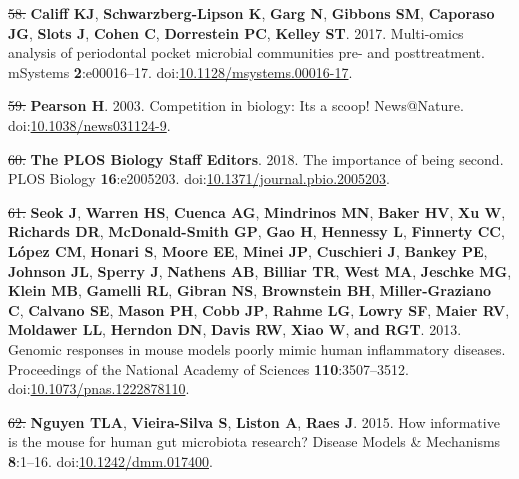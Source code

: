 \documentclass[]{article}
\providecommand{\DIFaddtex}[1]{{\protect\color{blue}\uwave{#1}}} %
\providecommand{\DIFdeltex}[1]{{\protect\color{red}\sout{#1}}}                      %
\providecommand{\DIFaddbegin}{} %
\providecommand{\DIFaddend}{} %
\providecommand{\DIFdelbegin}{} %
\providecommand{\DIFdelend}{} %
\providecommand{\DIFadd}[1]{\texorpdfstring{\DIFaddtex{#1}}{#1}} %
\providecommand{\DIFdel}[1]{\texorpdfstring{\DIFdeltex{#1}}{}} %
\begin{document}
\hypertarget{ref-Califf2017}{}
\DIFdelbegin \DIFdel{58. }\DIFdelend \DIFaddbegin \DIFadd{60. }\DIFaddend \textbf{Califf KJ}, \textbf{Schwarzberg-Lipson K}, \textbf{Garg N},
\textbf{Gibbons SM}, \textbf{Caporaso JG}, \textbf{Slots J},
\textbf{Cohen C}, \textbf{Dorrestein PC}, \textbf{Kelley ST}. 2017.
Multi-omics analysis of periodontal pocket microbial communities pre-
and posttreatment. mSystems \textbf{2}:e00016--17.
doi:\href{https://doi.org/10.1128/msystems.00016-17}{10.1128/msystems.00016-17}.

\hypertarget{ref-Pearson2003}{}
\DIFdelbegin \DIFdel{59. }\DIFdelend \DIFaddbegin \DIFadd{61. }\DIFaddend \textbf{Pearson H}. 2003. Competition in biology: Its a scoop!
News@Nature.
doi:\href{https://doi.org/10.1038/news031124-9}{10.1038/news031124-9}.

\hypertarget{ref-PB2018}{}
\DIFdelbegin \DIFdel{60. }\DIFdelend \DIFaddbegin \DIFadd{62. }\DIFaddend \textbf{The PLOS Biology Staff Editors}. 2018. The importance of
being second. PLOS Biology \textbf{16}:e2005203.
doi:\href{https://doi.org/10.1371/journal.pbio.2005203}{10.1371/journal.pbio.2005203}.

\hypertarget{ref-Seok2013}{}
\DIFdelbegin \DIFdel{61. }\DIFdelend \DIFaddbegin \DIFadd{63. }\DIFaddend \textbf{Seok J}, \textbf{Warren HS}, \textbf{Cuenca AG},
\textbf{Mindrinos MN}, \textbf{Baker HV}, \textbf{Xu W},
\textbf{Richards DR}, \textbf{McDonald-Smith GP}, \textbf{Gao H},
\textbf{Hennessy L}, \textbf{Finnerty CC}, \textbf{López CM},
\textbf{Honari S}, \textbf{Moore EE}, \textbf{Minei JP},
\textbf{Cuschieri J}, \textbf{Bankey PE}, \textbf{Johnson JL},
\textbf{Sperry J}, \textbf{Nathens AB}, \textbf{Billiar TR},
\textbf{West MA}, \textbf{Jeschke MG}, \textbf{Klein MB},
\textbf{Gamelli RL}, \textbf{Gibran NS}, \textbf{Brownstein BH},
\textbf{Miller-Graziano C}, \textbf{Calvano SE}, \textbf{Mason PH},
\textbf{Cobb JP}, \textbf{Rahme LG}, \textbf{Lowry SF}, \textbf{Maier
RV}, \textbf{Moldawer LL}, \textbf{Herndon DN}, \textbf{Davis RW},
\textbf{Xiao W}, \textbf{and RGT}. 2013. Genomic responses in mouse
models poorly mimic human inflammatory diseases. Proceedings of the
National Academy of Sciences \textbf{110}:3507--3512.
doi:\href{https://doi.org/10.1073/pnas.1222878110}{10.1073/pnas.1222878110}.

\hypertarget{ref-Nguyen2015}{}
\DIFdelbegin \DIFdel{62. }\DIFdelend \DIFaddbegin \DIFadd{64. }\DIFaddend \textbf{Nguyen TLA}, \textbf{Vieira-Silva S}, \textbf{Liston A},
\textbf{Raes J}. 2015. How informative is the mouse for human gut
microbiota research? Disease Models \& Mechanisms \textbf{8}:1--16.
doi:\href{https://doi.org/10.1242/dmm.017400}{10.1242/dmm.017400}.
\end{document}
